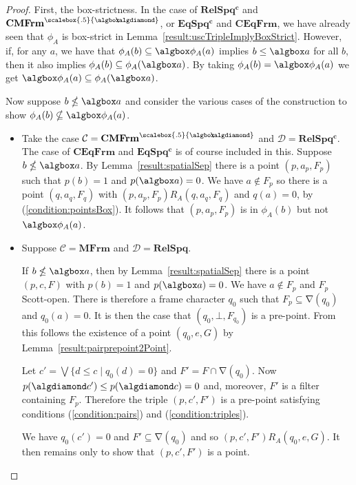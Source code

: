 \documentclass{article}[a4paper]
\theoremstyle{definition}
\newcommand{\Ccal}{\mathcal{C}} %
\newcommand{\Dcal}{\mathcal{D}} %
\newcommand{\relspq}{\mathbf{RelSpq}}
\newcommand{\relspqc}{\mathbf{RelSpq^c}}
\newcommand{\eqspqc}{\mathbf{EqSpq^c}}
\newcommand{\mfrm}{\mathbf{MFrm}}
\newcommand{\cmfrms}{\mathbf{CMFrm}^{\scalebox{.5}{\algbox\!\!\!\algdiamond}}}
\newcommand{\ceqfrm}{\mathbf{CEqFrm}}
\DeclareMathOperator{\charop}{\nabla}
\begin{document}
\begin{proof}
First, the box-strictness. In the case of $\relspqc$ and $\cmfrms$, or $\eqspqc$ and $\ceqfrm$, we have already seen that $\phi_A$ is box-strict in Lemma~\ref{result:uscTripleImplyBoxStrict}. However, if, for any $a$, we have that $\phi_A(b) \subseteq \algbox \phi_A(a)$ implies $b \leq \algbox a$ for all $b$, then it also implies $\phi_A (b) \subseteq \phi_A (\algbox a)$. By taking 
$\phi_A (b) = \algbox \phi_A(a)$ we get 
$\algbox \phi_A (a) \subseteq \phi_A (\algbox a)$. 

Now suppose $b \nleq \algbox a$ and consider the various cases of the construction to show $\phi_A (b) \nsubseteq \algbox \phi_A(a)$.

    \begin{itemize}
        \item Take the case $\Ccal = \cmfrms$ and $\Dcal = \relspqc$. The case of $\ceqfrm$ and $\eqspqc$ is of course included in this. Suppose $b \nleq \algbox a$. By Lemma~\ref{result:spatialSep} there is a point $(p,a_p,F_p)$ such that $p(b) = 1$ and $p(\algbox a) =0$. We have $a \notin F_p$ so there is a point $(q,a_q,F_q)$ with $(p,a_p,F_p)R_A (q,a_q,F_q)$ and $q(a) = 0$, by (\ref{condition:pointsBox}). It follows that $(p,a_p,F_p)$ is in $\phi_A (b)$ but not $\algbox \phi_A (a)$.
 
        
        \item Suppose $\Ccal = \mfrm$ and $\Dcal = \relspq$.

        If $b \nleq \algbox a$, then by Lemma~\ref{result:spatialSep} there is a point $(p,c,F)$ with $p(b)=1$ and $p(\algbox a)=0$. We have $a \notin F_p$ and $F_p$ Scott-open. There is therefore a frame character $q_0$ such that 
        $F_p \subseteq \charop(q_0)$ and $q_0 (a) = 0$. It is then the case that $(q_0 , \bot , F_{q_0})$ is  a pre-point. From this follows the existence of a point $(q_0,e,G)$ by Lemma~\ref{result:pairprepoint2Point}.

        Let $c' = \bigvee \{ d \leq c \mid q_0(d)=0 \}$ and $F'  = F \cap \charop(q_0)$. 
        Now $p(\algdiamond c') \leq p(\algdiamond c) = 0$ and, moreover, $F'$ is a filter containing $F_p$. 
        Therefore the triple $(p,c',F')$ is a pre-point satisfying conditions (\ref{condition:pairs}) and (\ref{condition:triples}).
        
        We have $q_0 (c') = 0$ and $F' \subseteq \charop (q_0)$ and so 
        $(p,c',F') R_A (q_0,e,G)$. It
        then remains only to show that $(p,c',F')$ is a point. 
        

\end{itemize}
\end{proof}
\end{document}
